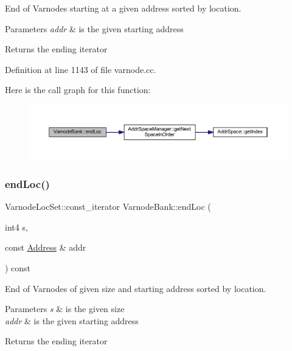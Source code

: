 End of Varnodes starting at a given address sorted by location. 


\begin{DoxyParams}{Parameters}
{\em addr} & is the given starting address \\
\hline
\end{DoxyParams}
\begin{DoxyReturn}{Returns}
the ending iterator 
\end{DoxyReturn}


Definition at line 1143 of file varnode.\+cc.

Here is the call graph for this function\+:
\nopagebreak
\begin{figure}[H]
\begin{center}
\leavevmode
\includegraphics[width=350pt]{class_varnode_bank_ad4f1a373644dccfa63af8cdd56753afd_cgraph}
\end{center}
\end{figure}
\mbox{\label{class_varnode_bank_ac38dab2a950a91fffdc237b5427641f5}} 
\subsubsection{\texorpdfstring{endLoc()}{endLoc()}\hspace{0.1cm}{\footnotesize\ttfamily [4/6]}}
{\footnotesize\ttfamily Varnode\+Loc\+Set\+::const\+\_\+iterator Varnode\+Bank\+::end\+Loc (\begin{DoxyParamCaption}\item[{int4}]{s,  }\item[{const \mbox{\hyperlink{class_address}{Address}} \&}]{addr }\end{DoxyParamCaption}) const}



End of Varnodes of given size and starting address sorted by location. 


\begin{DoxyParams}{Parameters}
{\em s} & is the given size \\
\hline
{\em addr} & is the given starting address \\
\hline
\end{DoxyParams}
\begin{DoxyReturn}{Returns}
the ending iterator 
\end{DoxyReturn}



